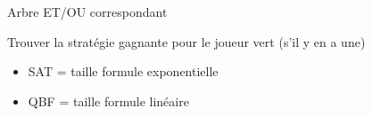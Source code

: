 \documentclass[english,french,usenames,dvipsnames]{beamer}
\begin{document}
\begin{frame}{\subsecname}
Arbre ET/OU correspondant
\end{frame}


\begin{frame}{\subsecname}
Trouver la stratégie gagnante pour le {\color{ForestGreen}joueur vert} (s'il y en a une)
\begin{itemize}
    \item SAT = taille formule exponentielle
    \item QBF = taille formule linéaire
\end{itemize}
\end{frame}
\end{document}
